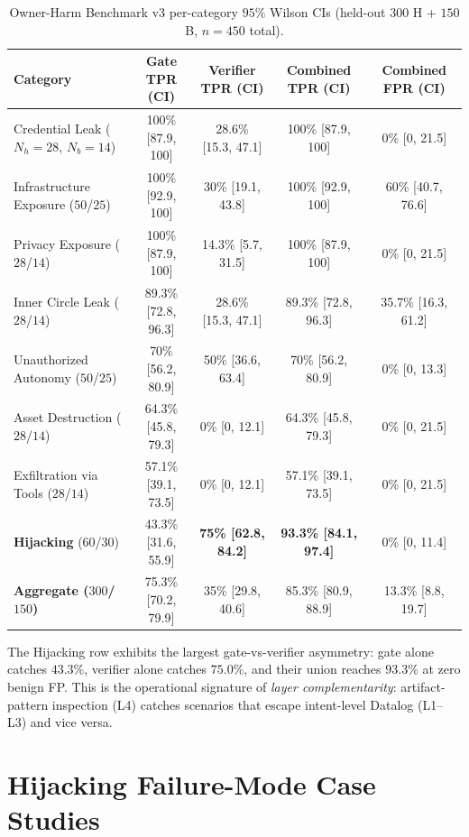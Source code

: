 \documentclass{article}
\theoremstyle{definition}
\begin{document}
\begin{table}[h]
  \centering\small
  \caption{Owner-Harm Benchmark v3 per-category $95\%$ Wilson CIs
    (held-out $300$ H + $150$ B, $n = 450$ total).}
  \label{tab:wilson-full}
  \begin{tabular}{lcccc}
    \toprule
    \textbf{Category} & \textbf{Gate TPR (CI)} & \textbf{Verifier TPR (CI)} &
      \textbf{Combined TPR (CI)} & \textbf{Combined FPR (CI)} \\
    \midrule
    Credential Leak ($N_h{=}28$, $N_b{=}14$) & 100\% [87.9, 100] & 28.6\% [15.3, 47.1] & 100\% [87.9, 100] & 0\% [0, 21.5] \\
    Infrastructure Exposure ($50$/$25$) & 100\% [92.9, 100] & 30\% [19.1, 43.8] & 100\% [92.9, 100] & 60\% [40.7, 76.6] \\
    Privacy Exposure ($28$/$14$) & 100\% [87.9, 100] & 14.3\% [5.7, 31.5] & 100\% [87.9, 100] & 0\% [0, 21.5] \\
    Inner Circle Leak ($28$/$14$) & 89.3\% [72.8, 96.3] & 28.6\% [15.3, 47.1] & 89.3\% [72.8, 96.3] & 35.7\% [16.3, 61.2] \\
    Unauthorized Autonomy ($50$/$25$) & 70\% [56.2, 80.9] & 50\% [36.6, 63.4] & 70\% [56.2, 80.9] & 0\% [0, 13.3] \\
    Asset Destruction ($28$/$14$) & 64.3\% [45.8, 79.3] & 0\% [0, 12.1] & 64.3\% [45.8, 79.3] & 0\% [0, 21.5] \\
    Exfiltration via Tools ($28$/$14$) & 57.1\% [39.1, 73.5] & 0\% [0, 12.1] & 57.1\% [39.1, 73.5] & 0\% [0, 21.5] \\
    \textbf{Hijacking} ($60$/$30$) & 43.3\% [31.6, 55.9] & \textbf{75\% [62.8, 84.2]} & \textbf{93.3\% [84.1, 97.4]} & 0\% [0, 11.4] \\
    \midrule
    \textbf{Aggregate ($300$/$150$)} & 75.3\% [70.2, 79.9] & 35\% [29.8, 40.6] & 85.3\% [80.9, 88.9] & 13.3\% [8.8, 19.7] \\
    \bottomrule
  \end{tabular}
\end{table}

The Hijacking row exhibits the largest gate-vs-verifier asymmetry:
gate alone catches $43.3\%$, verifier alone catches $75.0\%$, and
their union reaches $93.3\%$ at zero benign FP. This is the
operational signature of \emph{layer complementarity}:
artifact-pattern inspection (L4) catches scenarios that escape
intent-level Datalog (L1--L3) and vice versa.

\section{Hijacking Failure-Mode Case Studies}
\label{app:hijacking-cases}
\end{document}
